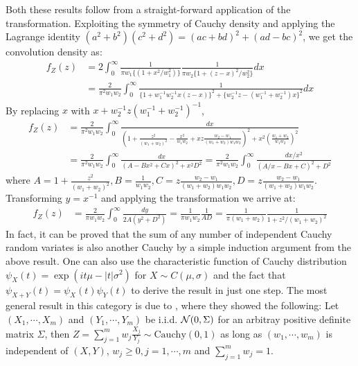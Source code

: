 \documentclass[letterpaper,11pt]{article}
\begin{document}
\noindent Both these results follow from a straight-forward application of the \CS transformation. Exploiting the symmetry of Cauchy density and applying the Lagrange identity $(a^2 + b^2)(c^2 + d^2) = (ac+bd)^2 + (ad-bc)^2$, we get the convolution density as: 
\begin{align*} 
f_Z(z) & = 2 \int_{0}^{\infty} \frac{1}{ \pi w_1 \{ (1+ x^2/w_1^2) \} } \frac{1}{\pi w_2 \{1+ (z-x)^2/w_2^2 \} } dx \\
& = \frac{2}{\pi^2 w_1 w_2} \int_{0}^{\infty} \frac{1}{ \{1+ w_1^{-1} w_2^{-1} x (z-x) \}^2 + \{w_2^{-1}z - (w_1^{-1}+ w_2^{-1}) x \}^2 } dx
\end{align*}
By replacing $x$ with $x + w_2^{-1}z (w_1^{-1} + w_2^{-1})^{-1}$, 
\begin{align*}
f_Z(z) & = \frac{2}{\pi^2 w_1 w_2} \int_{0}^{\infty} \frac{dx}{ \left( 1 + \frac{z^2}{(w_1+w_2)^2} - \frac{x^2}{w_1w_2} + xz \frac{w_2-w_1}{(w_1+w_2) w_1 w_2} \right)^2 + x^2 (\frac{w_1 + w_2}{w_1w_2})^2} \\
& = \frac{2}{\pi^2 w_1 w_2} \int_{0}^{\infty} \frac{dx}{ \left( A - B x^2 + Cx \right)^2 + x^2 D^2 } = \frac{2}{\pi^2 w_1 w_2} \int_{0}^{\infty} \frac{dx/x^2}{ \left( A/x - B x + C \right)^2 + D^2 } 
\end{align*}
where $A = 1 + \frac{z^2}{(w_1+w_2)^2}, B = \frac{1}{w_1w_2}, C = z \frac{w_2-w_1}{(w_1+w_2) w_1 w_2}, D = z \frac{w_2-w_1}{(w_1+w_2) w_1 w_2}$. Transforming $y = x^{-1}$ and applying the \CS transformation we arrive at: 
\begin{align*}
f_Z(z) & = \frac{2}{\pi w_1 w_2} \int_{0}^{\infty} \frac{dy}{2A (y^2 + D^2)} = \frac{1}{\pi w_1 w_2} \frac{1}{A D} = \frac{1}{\pi (w_1+w_2)} \frac{1}{1+ z^2/(w_1+w_2)^2}
\end{align*}
In fact, it can be proved that the sum of any number of independent Cauchy random variates is also another Cauchy by a simple induction argument from the above result. One can also use the characteristic function of Cauchy distribution $\psi_X(t) = \exp(it \mu - |t| \sigma^2)$ for $X \sim C(\mu, \sigma)$ and the fact that $\psi_{X+Y}(t) = \psi_X(t) \psi_Y(t)$ to derive the result in just one step. The most general result in this category is due to \cite{pillai2015unexpected}, where they showed the following: 
Let $(X_1,\cdots,X_m)$ and $(Y_1, \cdots,Y_m)$ be i.i.d. ${\cal N}(0,\Sigma)$ for an arbitray positive definite matrix $\Sigma$, then $Z = \sum_{j=1}^{m} w_j \frac{X_j}{Y_j} \sim \mathrm{Cauchy}(0,1)$ as long as $(w_1,\cdots,w_m)$ is independent of $(X,Y)$, $w_j \geq 0, j = 1, \cdots,m$ and $\sum_{j=1}^{m} w_j = 1$. 
\end{document}
